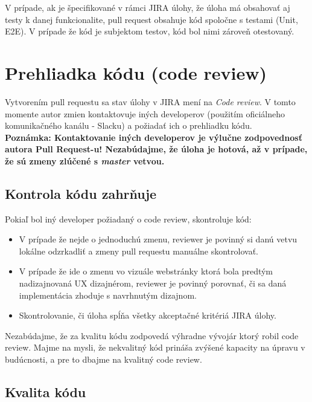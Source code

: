 \documentclass{article}
\begin{document}
    \noindent V prípade, ak je špecifikované v rámci JIRA úlohy, že úloha má obsahovať aj testy k danej funkcionalite,
    pull request obsahuje kód spoločne s testami (Unit, E2E). V prípade že kód je subjektom testov, kód bol nimi zároveň otestovaný.


    \section*{Prehliadka kódu (code review)}

    Vytvorením pull requestu sa stav úlohy v JIRA mení na \emph{Code review}.
    V tomto momente autor zmien kontaktovuje iných developerov (použitím oficiálneho
    komunikačného kanálu - Slacku) a požiadať ich o prehliadku kódu.\\

    \noindent \textbf{Poznámka: Kontaktovanie iných developerov je výlučne zodpovednosť autora Pull Request-u!
    Nezabúdajme, že úloha je hotová, až v prípade, že sú zmeny zlúčené s \emph{master} vetvou.} \\

    \subsection*{Kontrola kódu zahrňuje}

    \noindent Pokiaľ bol iný developer požiadaný o code review, skontroluje kód:

    \begin{itemize}
        \item V prípade že nejde o jednoduchú zmenu, reviewer je povinný si danú vetvu lokálne odzrkadliť a zmeny pull
        requestu manuálne skontrolovať.
        \item V prípade že ide o zmenu vo vizuále webstránky ktorá bola predtým nadizajnovaná UX dizajnérom, reviewer je povinný
        porovnať, či sa daná implementácia zhoduje s navrhnutým dizajnom.
        \item Skontrolovanie, či úloha spĺňa všetky akceptačné kritériá JIRA úlohy.
    \end{itemize}

    \noindent Nezabúdajme, že za kvalitu kódu zodpovedá výhradne vývojár ktorý robil code review. Majme na mysli, že nekvalitný kód
    prináša zvýšené kapacity na úpravu v budúcnosti, a pre to dbajme na kvalitný code review.

    \pagebreak

    \subsection*{Kvalita kódu}
\end{document}
